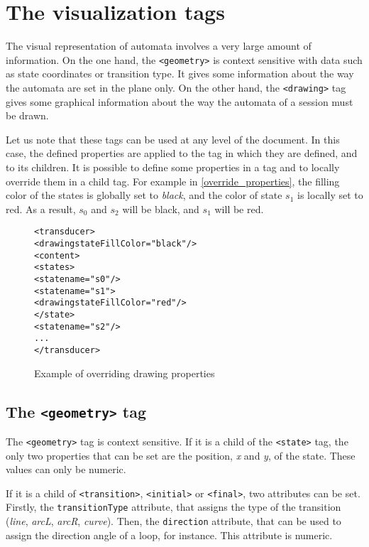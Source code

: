 \documentclass[a4paper]{article}
\newcommand{\xtag}[1]{\texttt{<#1>}}
\newcommand{\xattr}[1]{\texttt{#1}}
\begin{document}
\newpage
\section{The visualization tags}
\label{title_visualization}
The visual representation of automata involves a very large amount of
information. On the one hand, the \xtag{geometry} is context sensitive
with data such as state coordinates or transition type. It gives some
information about the way the automata are set in the plane only.  On
the other hand, the \xtag{drawing} tag gives some graphical information
about the way the automata of a session must be drawn.

Let us note that these tags can be used at any level of the document.
In this case, the defined properties are applied to the tag in which
they are defined, and to its children. It is possible to define some
properties in a tag and to locally override them in a child tag. For
example in \autoref{override_properties}, the filling color of the
states is globally set to \textit{black}, and the color of state $s_1$
is locally set to red. As a result, $s_0$ and $s_2$ will be black, and
$s_1$ will be red.

\begin{figure}[htp]
  \small
  \begin{center}
\begin{alltt}
<transducer>
  <drawing stateFillColor="black"/>
  <content>
     <states>
        <state name="s0"/>
        <state name="s1">
            <drawing stateFillColor="red"/>
        </state>
        <state name="s2"/>
      ...
</transducer>
\end{alltt}

    \caption{Example of overriding drawing properties}
    \label{override_properties}
  \end{center}
\end{figure}

\subsection{The \xtag{geometry} tag}

The \xtag{geometry} tag is context sensitive. If it is a child of the
\xtag{state} tag, the only two properties that can be set are the
position, \textit{x} and \textit{y}, of the state. These values can only
be numeric.

If it is a child of \xtag{transition}, \xtag{initial} or \xtag{final},
two attributes can be set. Firstly, the \xattr{transitionType}
attribute, that assigns the type of the transition (\textit{line},
\textit{arcL}, \textit{arcR}, \textit{curve}). Then, the
\xattr{direction} attribute, that can be used to assign the direction
angle of a loop, for instance. This attribute is numeric.
\end{document}
